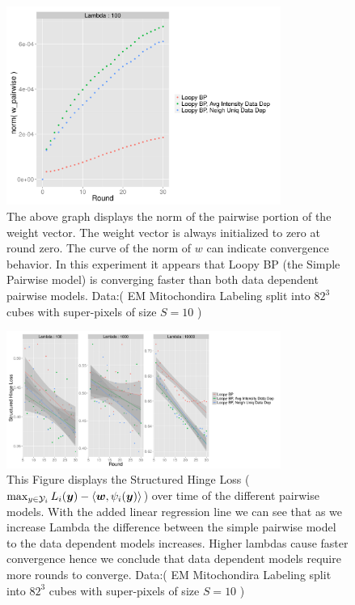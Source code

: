 \begin{figure}
  \centering
  \includegraphics[width=0.8\textwidth]{images/mitochonSplit_pairwiseWnorm_overTime.png}
  \caption{ The above graph displays the norm of the pairwise portion of the weight vector. The weight vector is always initialized to zero at round zero. The curve of the norm of $w$ can indicate convergence behavior. In this experiment it appears that Loopy BP (the Simple Pairwise model) is converging faster than both data dependent pairwise models. Data:( EM Mitochondira Labeling split into $82^3$ cubes with super-pixels of size $S=10$ \cite{mitochondriaData} )} 
  \label{fig:mitochonPairwiseNorm}
\end{figure}

\begin{figure}
  \centering
  \includegraphics[width=0.8\textwidth]{images/mitochonSplit_shloss_difLambda.png}
  \caption{  This Figure displays the Structured Hinge Loss ($\max_{y \in \mathcal{Y}_i} L_i(\bm{y})-\langle \bm{w}, \psi_i(\bm{y}) \rangle$) over time of the different pairwise models. With the added linear regression line we can see that as we increase Lambda the difference between the simple pairwise model to the data dependent models increases. Higher lambdas cause faster convergence hence we conclude that data dependent models require more rounds to converge. Data:( EM Mitochondira Labeling split into $82^3$ cubes with super-pixels of size $S=10$ \cite{mitochondriaData} )} 
  \label{fig:mitochonDifLambdaShLoss}
\end{figure}




